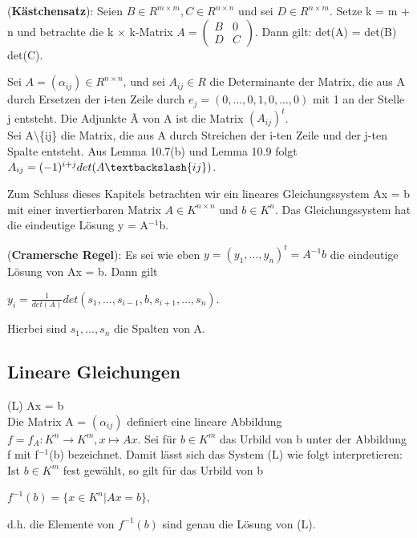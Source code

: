 \begin{lemma}
(\textbf{Kästchensatz}): Seien $B \in R^{m \times m},C \in R^{n \times n}$ und sei $D \in R^{n \times m}$. Setze k = m + n und betrachte die k $\times$ k-Matrix $A = \begin{pmatrix} B & 0 \\ D & C \end{pmatrix}$. Dann gilt: det(A) = det(B) det(C).
\end{lemma}

\begin{definition}
Sei $A = (\alpha_{ij}) \in R^{n \times n}$, und sei $A_{ij} \in R$ die Determinante der Matrix, die aus A durch Ersetzen der i-ten Zeile durch $e_j = (0,...,0,1,0,...,0)$ mit 1 an der Stelle j entsteht. Die Adjunkte \~{A} von A ist die Matrix $(A_{ij})^t$.\\
Sei A\textbackslash\{ij\} die Matrix, die aus A durch Streichen der i-ten Zeile und der j-ten Spalte entsteht. Aus Lemma 10.7(b) und Lemma 10.9 folgt $A_{ij} =(-1)^{i+j} det(A\textbackslash\{ij\})$.
\end{definition}

Zum Schluss dieses Kapitels betrachten wir ein lineares Gleichungssystem Ax = b mit einer invertierbaren Matrix $A \in K^{n \times n}$ und $b \in K^n$. Das Gleichungssystem hat die eindeutige Lösung y = A$^{-1}$b.

\begin{theorem}
(\textbf{Cramersche Regel}): Es sei wie eben $y = (y_1, …, y_n)^t = A^{-1}b$ die eindeutige Lösung von Ax = b. Dann gilt
\begin{center}
$y_i = \frac{1}{det(A)} det(s_1, …, s_{i-1}, b, s_{i+1}, …, s_n)$.
\end{center}
Hierbei sind $s_1, …, s_n$ die Spalten von A.
\end{theorem}

\subsection{Lineare Gleichungen}
(L)  Ax = b\\
Die Matrix A = $(\alpha_{ij})$ definiert eine lineare Abbildung $f = f_A: K^n \to K^m, x \mapsto Ax$. Sei für $b \in K^m$ das Urbild von b unter der Abbildung f mit f$^{-1}$(b) bezeichnet. Damit lässt sich das System (L) wie folgt interpretieren: Ist $b \in K^m$ fest gewählt, so gilt für das Urbild von b
\begin{center}
$f^{-1}(b) = \{x \in K^n | Ax = b\}$,
\end{center}
d.h. die Elemente von $f^{-1}(b)$ sind genau die Lösung von (L).

